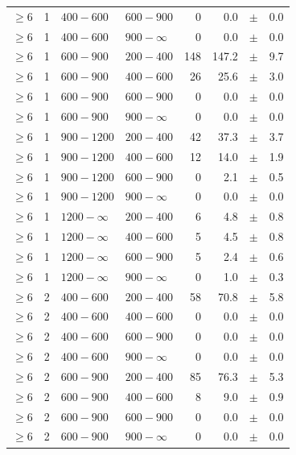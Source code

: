 \begin{table}[!h]
\begin{tabular}{rrllrrcl}
$\geq 6$ & 1 & $ 400- 600$ & $600-900$ &      0 &      0.0 &$\pm$&    0.0 \\
$\geq 6$ & 1 & $ 400- 600$ & $900-\infty$ &      0 &      0.0 &$\pm$&    0.0 \\
$\geq 6$ & 1 & $ 600- 900$ & $200-400$ &    148 &    147.2 &$\pm$&    9.7 \\
$\geq 6$ & 1 & $ 600- 900$ & $400-600$ &     26 &     25.6 &$\pm$&    3.0 \\
$\geq 6$ & 1 & $ 600- 900$ & $600-900$ &      0 &      0.0 &$\pm$&    0.0 \\
$\geq 6$ & 1 & $ 600- 900$ & $900-\infty$ &      0 &      0.0 &$\pm$&    0.0 \\
$\geq 6$ & 1 & $ 900-1200$ & $200-400$ &     42 &     37.3 &$\pm$&    3.7 \\
$\geq 6$ & 1 & $ 900-1200$ & $400-600$ &     12 &     14.0 &$\pm$&    1.9 \\
$\geq 6$ & 1 & $ 900-1200$ & $600-900$ &      0 &      2.1 &$\pm$&    0.5 \\
$\geq 6$ & 1 & $ 900-1200$ & $900-\infty$ &      0 &      0.0 &$\pm$&    0.0 \\
$\geq 6$ & 1 & $1200- \infty$ & $200-400$ &      6 &      4.8 &$\pm$&    0.8 \\
$\geq 6$ & 1 & $1200- \infty$ & $400-600$ &      5 &      4.5 &$\pm$&    0.8 \\
$\geq 6$ & 1 & $1200- \infty$ & $600-900$ &      5 &      2.4 &$\pm$&    0.6 \\
$\geq 6$ & 1 & $1200- \infty$ & $900-\infty$ &      0 &      1.0 &$\pm$&    0.3 \\
$\geq 6$ & 2 & $ 400- 600$ & $200-400$ &     58 &     70.8 &$\pm$&    5.8 \\
$\geq 6$ & 2 & $ 400- 600$ & $400-600$ &      0 &      0.0 &$\pm$&    0.0 \\
$\geq 6$ & 2 & $ 400- 600$ & $600-900$ &      0 &      0.0 &$\pm$&    0.0 \\
$\geq 6$ & 2 & $ 400- 600$ & $900-\infty$ &      0 &      0.0 &$\pm$&    0.0 \\
$\geq 6$ & 2 & $ 600- 900$ & $200-400$ &     85 &     76.3 &$\pm$&    5.3 \\
$\geq 6$ & 2 & $ 600- 900$ & $400-600$ &      8 &      9.0 &$\pm$&    0.9 \\
$\geq 6$ & 2 & $ 600- 900$ & $600-900$ &      0 &      0.0 &$\pm$&    0.0 \\
$\geq 6$ & 2 & $ 600- 900$ & $900-\infty$ &      0 &      0.0 &$\pm$&    0.0 \\

\end{tabular}
\end{table}
